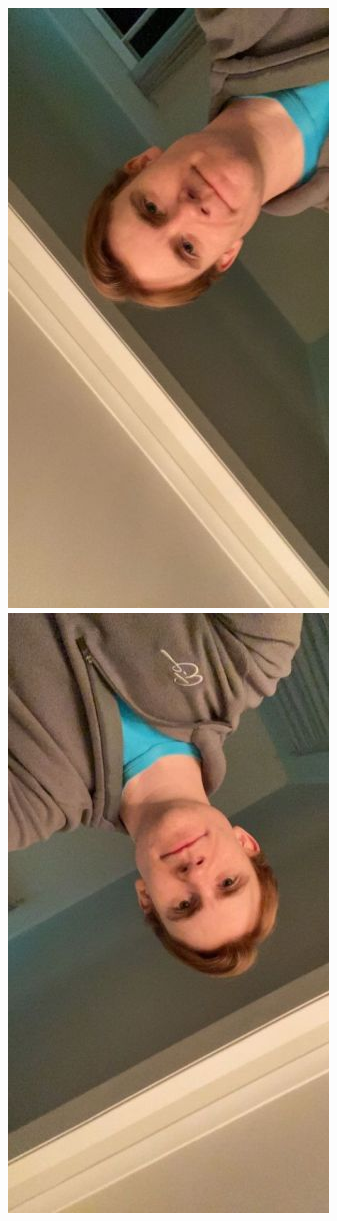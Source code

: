 \begin{figure}[h]
    \subfloat
        {\includegraphics[scale = 0.13]{figures/0151.jpg}\hspace{0.4cm}}
    \subfloat
        {\includegraphics[scale = 0.13]{figures/0172.jpg}\hspace{0.4cm}}

\end{figure}
